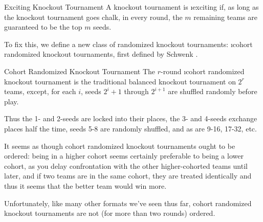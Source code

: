 {    \begin{definition}{Exciting Knockout Tournament}{}
        A knockout tournament is \i{exciting} if, as long as the knockout tournament goes chalk, in every round, the $m$ remaining teams are guaranteed to be the top $m$ seeds.
    \end{definition}
    
    To fix this, we define a new class of randomized knockout tournaments: \i{cohort randomized knockout tournaments}, first defined by Schwenk \cite{randomized_cohort}.
    
    \begin{definition}{Cohort Randomized Knockout Tournament}{}
        The $r$-round \i{cohort randomized knockout tournament} is the traditional balanced knockout tournament on $2^r$ teams, except, for each $i$, seeds $2^i + 1$ through $2^{i+1}$ are shuffled randomly before play.
    \end{definition}

    Thus the 1- and 2-seeds are locked into their places, the 3- and 4-seeds exchange places half the time, seeds 5-8 are randomly shuffled, and as are 9-16, 17-32, etc. 
    

    It seems as though cohort randomized knockout tournaments ought to be ordered: being in a higher cohort seems certainly preferable to being a lower cohort, as you delay confrontation with the other higher-cohorted teams until later, and if two teams are in the same cohort, they are treated identically and thus it seems that the better team would win more.

    Unfortunately, like many other formats we've seen thus far, cohort randomized knockout tournaments are not (for more than two rounds) ordered. 


    }
